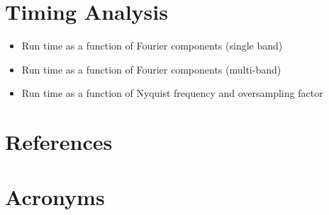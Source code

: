 \documentclass[DM,authoryear,toc]{lsstdoc}
\begin{document}
\section{Timing Analysis}

\begin{itemize}
\item Run time as a function of Fourier components (single band)
\item Run time as a function of Fourier components (multi-band)
\item Run time as a function of Nyquist frequency and oversampling factor
\end{itemize}


\appendix
\section{References} \label{sec:bib}
\renewcommand{\refname}{} %


\section{Acronyms} \label{sec:acronyms}

\end{document}
